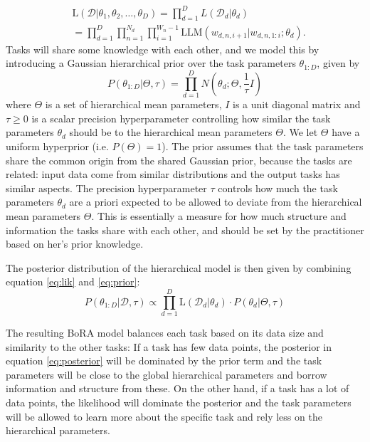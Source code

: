 \documentclass{article}
\begin{document}
\begin{align}  \label{eq:lik}
    & \text{L}(\mathcal{D} | \theta_1, \theta_2, \ldots, \theta_D) = \prod_{d=1}^D L(\mathcal{D}_d | \theta_d) \nonumber \\
    &= \prod_{d=1}^D \prod_{n=1}^{N_d} \prod_{i=1}^{W_n-1} \text{LLM}(w_{d,n,i+1} | w_{d,n,1:i}; \theta_d).
\end{align}
%
%
Tasks will share some knowledge with each other, and we model this by introducing a Gaussian hierarchical prior over the task parameters $\theta_{1:D}$, given by
\begin{equation} \label{eq:prior}
    P(\theta_{1:D} | \Theta, \tau ) = \prod_{d=1}^D N(\theta_d ; \Theta, \frac{1}{\tau} I)
\end{equation}
%
where $\Theta$ is a set of hierarchical mean parameters, $I$ is a unit diagonal matrix and $\tau \geq 0$ is a scalar precision hyperparameter controlling how similar the task parameters $\theta_d$ should be to the hierarchical mean parameters $\Theta$.
We let $\Theta$ have a uniform hyperprior (i.e. $P(\Theta) = 1$). The prior assumes that the task parameters share the common origin from the shared Gaussian prior, because the tasks are related: input data come from similar distributions and the output tasks has similar aspects. 
The precision hyperparameter $\tau$ controls how much the task parameters $\theta_d$ are a priori expected to be allowed to deviate from the hierarchical mean parameters $\Theta$. 
This is essentially a measure for how much structure and information the tasks share with each other, and should be set by the practitioner based on her's prior knowledge.

The posterior distribution of the hierarchical model is then given by combining equation \ref{eq:lik} and \ref{eq:prior}:
\begin{equation} \label{eq:posterior}
    P(\theta_{1:D} | \mathcal{D}, \tau) \propto \prod_{d=1}^D \text{L}(\mathcal{D}_d | \theta_d) \cdot P(\theta_d | \Theta, \tau)
\end{equation}
%
%

The resulting BoRA model balances each task based on its data size and similarity to the other tasks: If a task has few data points, the posterior in equation \ref{eq:posterior} will be dominated by the prior term and the task parameters will be close to the global hierarchical parameters and borrow information and structure from these. On the other hand, if a task has a lot of data points, the likelihood will dominate the posterior and the task parameters will be allowed to learn more about the specific task and rely less on the hierarchical parameters.
\end{document}
